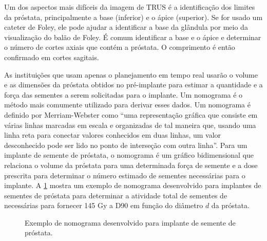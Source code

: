 \documentclass[11pt,a4paper]{article}
\newcounter{exemplo}
\begin{document}
	Um dos aspectos mais difíceis da imagem de TRUS é a identificação dos limites da próstata, principalmente a base (inferior) e o ápice (superior). Se for usado um cateter de Foley, ele pode ajudar a identificar a base da glândula por meio da visualização do balão de Foley. É comum identificar a base e o ápice e determinar o número de cortes axiais que contém a próstata. O comprimento é então confirmado em cortes sagitais.

	As instituições que usam apenas o planejamento em tempo real usarão o volume e as dimensões da próstata obtidos no pré-implante para estimar a quantidade e a força das sementes a serem solicitadas para o implante. Um nomograma é o método mais comumente utilizado para derivar esses dados. Um nomograma é definido por Merriam-Webster como “uma representação gráfica que consiste em várias linhas marcadas em escala e organizadas de tal maneira que, usando uma linha reta para conectar valores conhecidos em duas linhas, um valor desconhecido pode ser lido no ponto de interseção com outra linha”. Para um implante de semente de próstata, o nomograma é um gráfico bidimensional que relaciona o volume da próstata para uma determinada força de semente e a dose prescrita para determinar o número estimado de sementes necessárias para o implante. A \ref{fig:nomogramaImplanteProstata} mostra um exemplo de nomograma desenvolvido para implantes de sementes de próstata para determinar a atividade total de sementes de  necessárias para fornecer 145 Gy a D90 em função do diâmetro $d$ da próstata.

	\begin{figure}[h]
		\centering
		\caption{Exemplo de nomograma desenvolvido para implante de semente de próstata.}
		\label{fig:nomogramaImplanteProstata}
	\end{figure}
\end{document}
